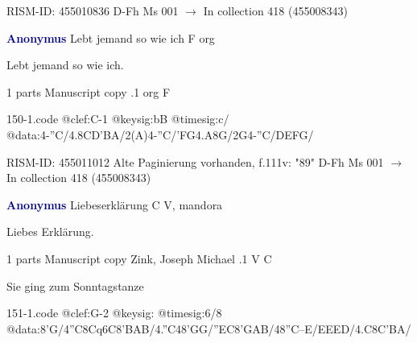 \documentclass[twocolumn]{book}
\begin{document}
\newline RISM-ID: 455010836
\newline D-Fh  Ms 001
\newline $\rightarrow$ In collection 418 (455008343)

\newline \par \vspace{7pt} \textcolor{darkblue}{\textbf{Anonymus  }}
\newline Lebt jemand so wie ich  F  
\newline org
\newline \begin{itshape} Lebt jemand so wie ich.\end{itshape} 
\newline \textcolor{darkblue}{}  1 parts  
\newline Manuscript copy
.1  org  F  
\begin{filecontents*}{150-1.code}
@clef:C-1
@keysig:bB
@timesig:c/
@data:4-''C/4.8CD'BA/2(A)4-''C/'FG4.A8G/2G4-''C/DEFG/
\end{filecontents*}
\newline
%

\newline RISM-ID: 455011012
\newline Alte Paginierung vorhanden, f.111v: "89"
\newline D-Fh  Ms 001
\newline $\rightarrow$ In collection 418 (455008343)

\newline \par \vspace{7pt} \textcolor{darkblue}{\textbf{Anonymus  }}
\newline Liebeserklärung  C  
\newline V, mandora
\newline \begin{itshape}[heading, f.46v:] Liebes Erklärung.\end{itshape} 
\newline \textcolor{darkblue}{}  1 parts  
\newline Manuscript copy
\newline Zink, Joseph Michael
.1  V  C
\newline \begin{footnotesize} Sie ging zum Sonntagstanze \end{footnotesize}  
\begin{filecontents*}{151-1.code}
@clef:G-2
@keysig:
@timesig:6/8
@data:8'G/4''C8Cq6C{8'BA}B/4.''C48'GG/''EC{8'GA}B/48''C--E/EEED/4.C{8C'B}A/
\end{filecontents*}
\newline
%
\end{document}
